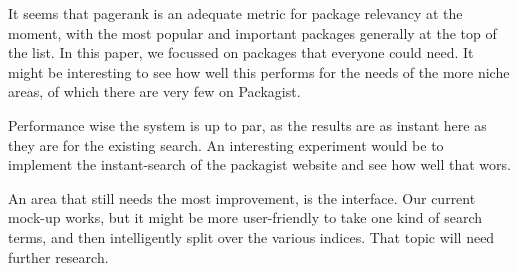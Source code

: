 \documentclass{article}
\begin{document}
It seems that pagerank is an adequate metric for package relevancy at the moment, with the most popular and important packages generally at the top of the list. In this paper, we focussed on packages that everyone could need. It might be interesting to see how well this performs for the needs of the more niche areas, of which there are very few on Packagist.

Performance wise the system is up to par, as the results are as instant here as they are for the existing search. An interesting experiment would be to implement the instant-search of the packagist website and see how well that wors.

An area that still needs the most improvement, is the interface. Our current mock-up works, but it might be more user-friendly to take one kind of search terms, and then intelligently split over the various indices. That topic will need further research.

{}

\end{document}
